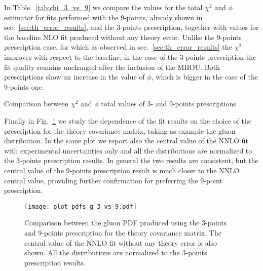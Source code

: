 %
In Table.~\ref{tab:chi_3_vs_9} we compare the values for the total $\chi^2$ and $\phi$ estimator for fits performed with the 9-points,
already shown in sec.~\ref{sec:th_error_results}, and the 3-points
prescription, together with values for the baseline NLO fit produced without any theory error.
Unlike the 9-points prescription case, for which as observed in sec.~\ref{sec:th_error_results}
the $\chi^2$ improves with respect to the baseline,
in the case of the 3-points prescription the fit quality remains unchanged after the inclusion of the MHOU.
Both prescriptions show an increase in the value of $\phi$, which is bigger in the case of the 9-points one.

\begin{table}[ht!]
	\centering
	\small
	
        \vspace{3mm}
	\caption{Comparison between $\chi^2$ and $\phi$ total values of 3- and 9-points prescriptions}
	\label{tab:chi_3_vs_9}
\end{table}

%
Finally in Fig.~\ref{fig:pdfs_plots_th_err_3_vs_9} we study the dependence of the fit results on the choice of the prescription
for the theory covariance matrix, taking as example the gluon distribution. In the same plot we report also the central value of
the NNLO fit with experimental uncertainties only and all the distributions are normalized to the 3-points prescription results.
In general the two results are consistent, but the central value of the 9-points prescription result is much closer 
to the NNLO central value, providing further confirmation for preferring the 9-point prescription.

\begin{figure}[t!]
    \begin{center}
        \texttt{[image: plot\_pdfs\_g\_3\_vs\_9.pdf]}
        \caption{Comparison between the gluon PDF produced using the 3-points and 9-points prescription
        for the theory covariance matrix. The central value of the NNLO fit without any theory error is also shown.
        All the distributions are normalized to the 3-points prescription results.} 
        \label{fig:pdfs_plots_th_err_3_vs_9} 
    \end{center}
\end{figure}